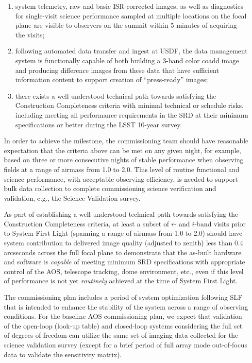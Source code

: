\documentclass[SE,authoryear,toc]{lsstdoc}
\begin{document}
\begin{enumerate}
\begin{enumerate}
  \end{enumerate}
  \item system telemetry, raw and basic ISR-corrected images, as well as diagnostics for single-visit science performance sampled at multiple locations on the focal plane are visible to observers on the summit within 5 minutes of acquiring the visits;
  \item following automated data transfer and ingest at USDF, the data management system is functionally capable of both building a 3-band color coadd image and producing difference images from these data that have sufficient information content to support creation of ``press-ready'' images;
  \item there exists a well understood technical path towards satisfying the Construction Completeness criteria  with minimal technical or schedule risks, including meeting all performance requirements in the SRD at their minimum specifications or better during the LSST 10-year survey.
\end{enumerate}

In order to achieve the milestone, the commissioning team should have reasonable expectation that the criteria above can be met on any given night, for example, based on three or more consecutive nights of stable performance when observing fields at a range of airmass from 1.0 to 2.0.
This level of routine functional and science performance, with acceptable observing efficiency, is needed to support bulk data collection to complete commissioning science verification and validation, e.g., the Science Validation survey.

As part of establishing a well understood technical path towards satisfying the Construction Completeness criteria, at least a subset of $r$- and $i$-band visits prior to System First Light (spanning a range of airmass from 1.0 to 2.0) should have system contribution to delivered image quality (adjusted to zenith) less than 0.4 arcseconds across the full focal plane to demonstrate that the as-built hardware and software is \emph{capable} of meeting minimum SRD specifications with appropriate control of the AOS, telescope tracking, dome environment, etc., even if this level of performance is not yet \emph{routinely} achieved at the time of System First Light.

The commissioning plan includes a period of system optimization following SLF that is intended to enhance the stability of the system across a range of observing conditions.
For the baseline AOS commissioning plan, we expect that validation of the open-loop (look-up table) and closed-loop systems considering the full set of degrees of freedom can utilize the same set of imaging data collected for the science validation survey (except for a brief period of full array mode out-of-focus data to validate the sensitivity matrix).
\end{document}
